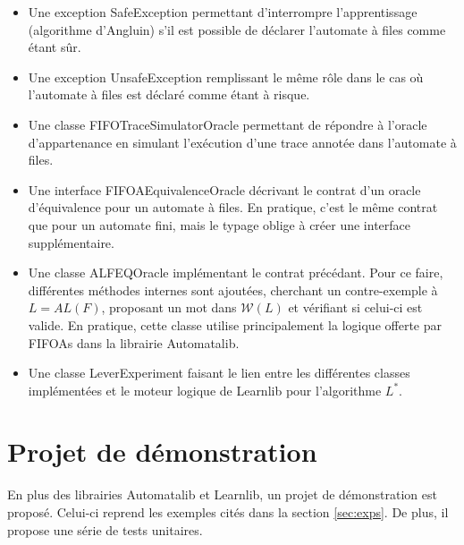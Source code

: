 \begin{itemize}
  \item Une exception SafeException permettant d'interrompre l'apprentissage (algorithme d'Angluin) s'il est possible de déclarer l'automate à files comme étant sûr.
  \item Une exception UnsafeException remplissant le même rôle dans le cas où l'automate à files est déclaré comme étant à risque.
  \item Une classe FIFOTraceSimulatorOracle permettant de répondre à l'oracle d'appartenance en simulant l'exécution d'une trace annotée dans l'automate à files.
  \item Une interface FIFOAEquivalenceOracle décrivant le contrat d'un oracle d'équivalence pour un automate à files. En pratique, c'est le même contrat que pour un automate fini, mais le typage oblige à créer une interface supplémentaire.
  \item Une classe ALFEQOracle implémentant le contrat précédant. Pour ce faire, différentes méthodes internes sont ajoutées, cherchant un contre-exemple à $L=AL(F)$, proposant un mot dans $\mathcal{W}(L)$ et vérifiant si celui-ci est valide. En pratique, cette classe utilise principalement la logique offerte par FIFOAs dans la librairie Automatalib.
  \item Une classe LeverExperiment faisant le lien entre les différentes classes implémentées et le moteur logique de Learnlib pour l'algorithme $L^*$.
\end{itemize}


\section{Projet de démonstration}

En plus des librairies Automatalib et Learnlib, un projet de démonstration est proposé. Celui-ci reprend les exemples cités dans la section \ref{sec:exps}. De plus, il propose une série de tests unitaires.

